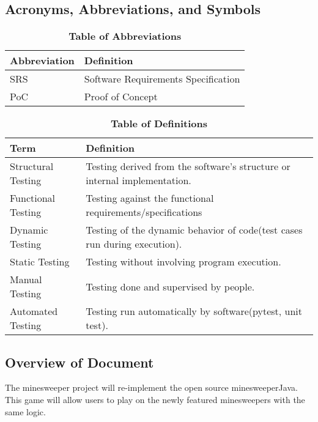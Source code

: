 \documentclass[12pt, titlepage]{article}
\begin{document}
\subsection{Acronyms, Abbreviations, and Symbols}
	
\begin{table}[hbp]
\caption{\textbf{Table of Abbreviations}} \label{Table}

\begin{tabularx}{\textwidth}{|p{3cm}|X|}
\toprule
\textbf{Abbreviation} & \textbf{Definition} \\
\midrule
SRS & Software Requirements Specification\\
\hline
PoC & Proof of Concept\\

\bottomrule
\end{tabularx}

\end{table}
\newpage
\begin{table}[!htbp]
\caption{\textbf{Table of Definitions}} \label{Table}

\begin{tabularx}{\textwidth}{|p{5cm}|X|}
\toprule
\textbf{Term} & \textbf{Definition}\\
\midrule
Structural Testing & Testing derived from the software's structure or internal implementation.\\
\hline
Functional Testing & Testing  against the functional requirements/specifications\\
\hline
Dynamic Testing &Testing of the dynamic behavior of code(test cases run during execution).\\
\hline
Static Testing & Testing without involving program execution.\\
\hline
Manual Testing & Testing done and supervised by people.\\
\hline
Automated Testing & Testing run automatically by software(pytest, unit test).\\
\bottomrule
\end{tabularx}

\end{table}	

\subsection{Overview of Document}
The minesweeper project will re-implement the open source minesweeperJava. This game will allow users to play on the newly featured minesweepers with the same logic.
\end{document}
